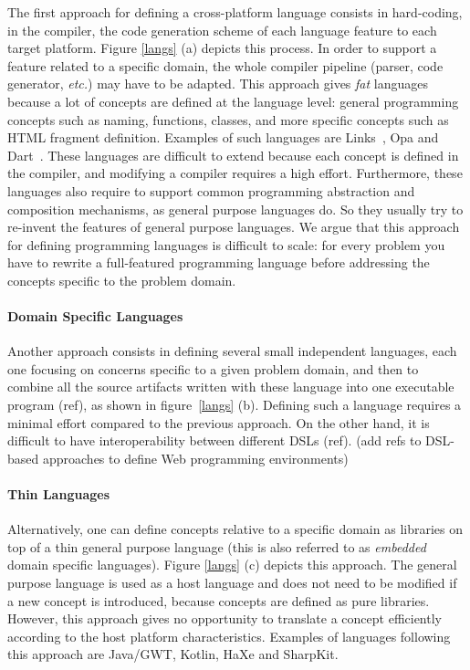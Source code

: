 \documentclass[preprint]{sigplanconf}
\newcommand{\etc}{\emph{etc.}}
\begin{document}
The first approach for defining a cross-platform language consists in hard-coding, in the compiler, the
code generation scheme of each language feature to each target platform. Figure \ref{langs} (a) depicts this
process. In order to support a feature related to a specific domain, the whole compiler pipeline (parser, code
generator, \etc) may have to be adapted. This approach gives \emph{fat} languages because a lot of concepts are
defined at the language level: general programming concepts such as naming, functions, classes, and more specific
concepts such as HTML fragment definition. Examples of such languages are Links~\cite{Cooper07_Links}, Opa and
Dart~\cite{Griffith11_Dart}. These languages are difficult to extend because each concept is defined in the compiler,
and modifying a compiler requires a high effort. Furthermore, these languages also require to support common
programming abstraction and composition mechanisms, as general purpose languages do. So they usually try to re-invent
the features of general purpose languages. We argue that this approach for defining programming languages is
difficult to scale: for every problem you have to rewrite a full-featured programming language before addressing the
concepts specific to the problem domain.

\paragraph{Domain Specific Languages}

Another approach consists in defining several small independent languages, each one focusing on concerns specific to
a given problem domain, and then to combine all the source artifacts written with these language into one executable
program (ref), as shown in figure~\ref{langs} (b). Defining such a language requires a minimal effort compared to the
previous approach. On the other hand, it is difficult to have interoperability between different DSLs (ref).
(add refs to DSL-based approaches to define Web programming environments)

\paragraph{Thin Languages}

Alternatively, one can define concepts relative to a specific domain as libraries on top of a thin general purpose
language (this is also referred to as \emph{embedded} domain specific languages). Figure \ref{langs} (c) depicts this
approach. The general purpose language is used as a host language and does not need to be modified if a new concept
is introduced, because concepts are defined as pure libraries. However, this approach gives no opportunity to
translate a concept efficiently according to the host platform characteristics. Examples of languages following this
approach are Java/GWT, Kotlin, HaXe and SharpKit.
\end{document}
